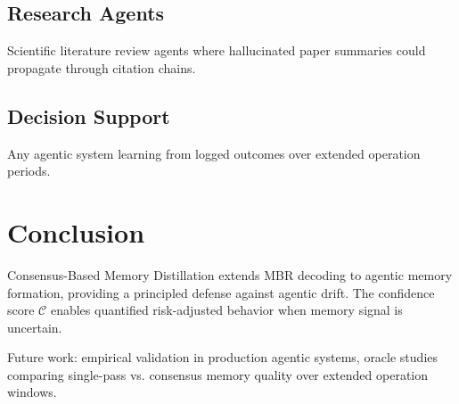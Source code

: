 \documentclass[11pt,a4paper]{article}
\begin{document}
\subsection{Research Agents}
Scientific literature review agents where hallucinated paper 
summaries could propagate through citation chains.

\subsection{Decision Support}
Any agentic system learning from logged outcomes over extended 
operation periods.

\section{Conclusion}

Consensus-Based Memory Distillation extends MBR decoding to agentic 
memory formation, providing a principled defense against agentic 
drift. The confidence score $\mathcal{C}$ enables quantified 
risk-adjusted behavior when memory signal is uncertain.

Future work: empirical validation in production agentic systems, 
oracle studies comparing single-pass vs. consensus memory quality 
over extended operation windows.
\end{document}
